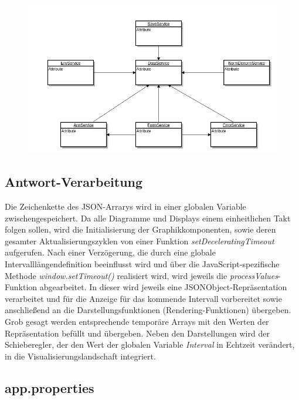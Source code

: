 \begin{figure}
\includegraphics[width=15cm]{sequence_dia_service_layer.png}
\end{figure}


\subsection{Antwort-Verarbeitung}
Die Zeichenkette des JSON-Arrarys wird in einer globalen Variable zwischengespeichert. Da alle Diagramme und Displays einem einheitlichen Takt folgen sollen, wird die Initialisierung der Graphikkomponenten, sowie deren gesamter Aktualisierungszyklen von einer Funktion \emph{setDeceleratingTimeout} aufgerufen. Nach einer Verzögerung, die durch eine globale Intervalllängendefinition beeinflusst wird und über die JavaScript-spezifische Methode \emph{window.setTimeout()} realisiert wird, wird jeweils die \emph{processValues}-Funktion abgearbeitet. In dieser wird jeweils eine JSONObject-Repräsentation verarbeitet und für die Anzeige für das kommende Intervall vorbereitet sowie anschließend an die Darstellungsfunktionen (Rendering-Funktionen) übergeben. Grob gesagt werden entsprechende temporäre Arrays mit den Werten der Repräsentation befüllt und übergeben. Neben den Darstellungen wird der Schieberegler, der den Wert der globalen Variable \emph{Interval} in Echtzeit verändert, in die Visualisierungslandschaft integriert. 

\subsection{app.properties}

